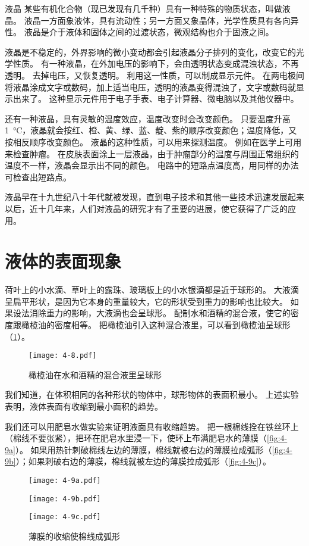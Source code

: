 \begin{Reading}{液晶}
某些有机化合物（现已发现有几千种）具有一种特殊的物质状态，叫做液晶。
液晶一方面象液体，具有流动性；另一方面又象晶体，光学性质具有各向异性。
液晶是介于液体和固体之间的过渡状态，微观结构也介于固液之间。

液晶是不稳定的，外界影响的微小变动都会引起液晶分子排列的变化，改变它的光学性质。
有一种液晶，在外加电压的影响下，会由透明状态变成混浊状态，不再透明。
去掉电压，又恢复透明。
利用这一性质，可以制成显示元件。
在两电极间将液晶涂成文字或数码，加上适当电压，透明的液晶变得混浊了，文字或数码就显示出来了。
这种显示元件用于电子手表、电子计算器、微电脑以及其他仪器中。

还有一种液晶，具有灵敏的温度效应，温度改变时会改变颜色。
只要温度升高 \qty{1}{\celsius}，液晶就会按红、橙、黄、绿、蓝、靛、紫的顺序改变颜色；温度降低，又按相反顺序改变颜色。
液晶的这种性质，可以用来探测温度。
例如在医学上可用来检查肿瘤。
在皮肤表面涂上一层液晶，由于肿瘤部分的温度与周围正常组织的温度不一样，液晶会显示出不同的颜色。
电路中的短路点温度高，用同样的办法可检查出短路点。

液晶早在十九世纪八十年代就被发现，直到电子技术和其他一些技术迅速发展起来以后，近十几年来，人们对液晶的研究才有了重要的进展，使它获得了广泛的应用。
\end{Reading}

\section{液体的表面现象}
荷叶上的小水滴、草叶上的露珠、玻璃板上的小水银滴都是近于球形的。
大液滴呈扁平形状，是因为它本身的重量较大，它的形状受到重力的影响也比较大。
如果设法消除重力的影响，大液滴也会呈球形。
配制水和酒精的混合液，使它的密度跟橄榄油的密度相等。
把橄榄油引入这种混合液里，可以看到橄榄油呈球形（\cref{fig:4-8}）。
\begin{figure}
	\texttt{[image: 4-8.pdf]}
	\caption{橄榄油在水和酒精的混合液里呈球形}\label{fig:4-8}
\end{figure}

我们知道，在体积相同的各种形状的物体中，球形物体的表面积最小。
上述实验表明，液体表面有收缩到最小面积的趋势。

我们还可以用肥皂水做实验来证明液面具有收缩趋势。
把一根棉线拴在铁丝环上（棉线不要张紧），把环在肥皂水里浸一下，使环上布满肥皂水的薄膜（\cref{fig:4-9a}）。
如果用热针刺破棉线左边的薄膜，棉线就被右边的薄膜拉成弧形（\cref{fig:4-9b}）；如果刺破右边的薄膜，棉线就被左边的薄膜拉成弧形（\cref{fig:4-9c}）。
\begin{figure}
	\begin{minipage}{0.32\linewidth}\centering
		\texttt{[image: 4-9a.pdf]}
	  \subcaption{}\label{fig:4-9a}
	\end{minipage}%
	\begin{minipage}{0.32\linewidth}\centering
		\texttt{[image: 4-9b.pdf]}
	  \subcaption{}\label{fig:4-9b}
	\end{minipage}%
	\begin{minipage}{0.32\linewidth}\centering
		\texttt{[image: 4-9c.pdf]}
	  \subcaption{}\label{fig:4-9c}
	\end{minipage}
	\caption{薄膜的收缩使棉线成弧形}\label{fig:4-9}
\end{figure}

